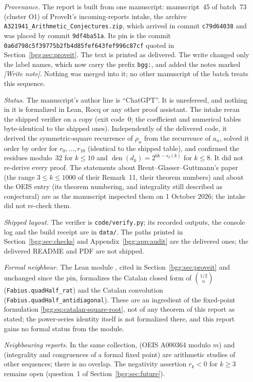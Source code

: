 \documentclass[11pt,a4paper]{article}
\numberwithin{equation}{section}
\theoremstyle{definition}
\theoremstyle{remark}
\theoremstyle{definition}
\newcommand{\den}{\operatorname{den}}
\newcommand{\repoSHA}{\texttt{0a6d798c5f39775b2fb4d85fef643fef996c87cf}}
\begin{document}
\emph{Provenance.} The report is built from one manuscript: manuscript~45
of batch~73 (cluster O1) of ProveIt's incoming-reports intake, the archive
\texttt{A321941\_Arithmetic\_Conjectures.zip}, which arrived in commit
\texttt{c79d64038} and was placed by commit \texttt{9df4ba51a}. Its pin is
the commit \repoSHA{} quoted in Section~\ref{bgg:sec:proveit}. The text is
printed as delivered. The write changed only the label names, which now
carry the prefix \texttt{bgg:}, and added the notes marked
\emph{[Write note]}. Nothing was merged into it; no other manuscript of
the batch treats this sequence.

\emph{Status.} The manuscript's author line is ``ChatGPT''. It is
unrefereed, and nothing in it is formalized in Lean, Rocq or any other
proof assistant. The intake reran the shipped verifier on a copy (exit
code~0; the coefficient and numerical tables byte-identical to the shipped
ones). Independently of the delivered code, it derived the
symmetric-square recurrence of $\rho_n$ from the recurrence of $a_n$,
solved it order by order for $r_0,\ldots,r_{10}$ (identical to the shipped
table), and confirmed the residues modulo~$32$ for $k\le10$ and
$\den(d_k)=2^{6k-s_2(k)}$ for $k\le8$. It did not re-derive every proof.
The statements about Brent--Glasser--Guttmann's paper (the range
$3\le k\le1000$ of their Remark~11, their theorem numbers) and about the
OEIS entry (its theorem numbering, and integrality still described as
conjectural) are as the manuscript inspected them on 1 October 2026; the
intake did not re-check them.

\emph{Shipped layout.} The verifier is \texttt{code/verify.py}; its
recorded outputs, the console log and the build receipt are in
\texttt{data/}. The paths printed in Section~\ref{bgg:sec:checks} and
Appendix~\ref{bgg:app:audit} are the delivered ones; the delivered README and PDF are not
shipped.

\emph{Formal neighbour.} The Lean module
,
cited in Section~\ref{bgg:sec:proveit} and unchanged since the pin,
formalizes the Catalan closed form of $\binom{1/2}{n}$
(\texttt{Fabius.quadHalf\_rat}) and the Catalan convolution
(\texttt{Fabius.quadHalf\_antidiagonal}). These are an ingredient of the
fixed-point formulation \eqref{bgg:eq:catalan-square-root}, not of any
theorem of this report as stated; the power-series identity itself is not
formalized there, and this report gains no formal status from the module.

\emph{Neighbouring reports.} In the same collection,
 (OEIS A000364 modulo $m$) and
 (integrality
and congruences of a formal fixed point) are arithmetic studies of other
sequences; there is no overlap. The negativity assertion $r_k<0$ for
$k\ge3$ remains open (question~1 of Section~\ref{bgg:sec:future}).
\end{document}
